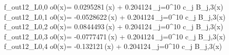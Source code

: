 f_{out12_L0,0	o0}(x)= 0.0295281\,\phi(x) + 0.204124\,\sum_{j=0}^{10} c_j B_{j,3}(x)
f_{out12_L0,1	o0}(x)= -0.0528622\,\phi(x) + 0.204124\,\sum_{j=0}^{10} c_j B_{j,3}(x)
f_{out12_L0,2	o0}(x)= 0.0844493\,\phi(x) + 0.204124\,\sum_{j=0}^{10} c_j B_{j,3}(x)
f_{out12_L0,3	o0}(x)= -0.0777471\,\phi(x) + 0.204124\,\sum_{j=0}^{10} c_j B_{j,3}(x)
f_{out12_L0,4	o0}(x)= -0.132121\,\phi(x) + 0.204124\,\sum_{j=0}^{10} c_j B_{j,3}(x)
